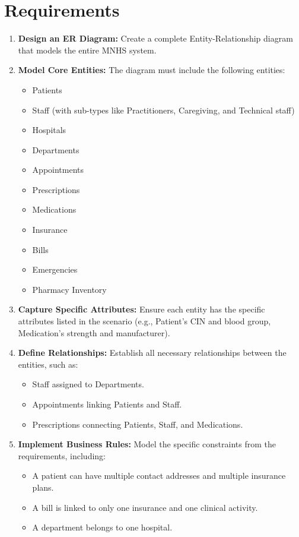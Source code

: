 \documentclass[a4paper,12pt]{article}
\begin{document}
\section{Requirements}
\begin{enumerate}
    \item \textbf{Design an ER Diagram:} Create a complete Entity-Relationship diagram that models the entire MNHS system.
    
    \item \textbf{Model Core Entities:} The diagram must include the following entities:
    \begin{itemize}
        \item Patients
        \item Staff (with sub-types like Practitioners, Caregiving, and Technical staff)
        \item Hospitals
        \item Departments
        \item Appointments
        \item Prescriptions
        \item Medications
        \item Insurance
        \item Bills
        \item Emergencies
        \item Pharmacy Inventory
    \end{itemize}
    
    \item \textbf{Capture Specific Attributes:} Ensure each entity has the specific attributes listed in the scenario (e.g., Patient's CIN and blood group, Medication's strength and manufacturer).
    
    \item \textbf{Define Relationships:} Establish all necessary relationships between the entities, such as:
    \begin{itemize}
        \item Staff assigned to Departments.
        \item Appointments linking Patients and Staff.
        \item Prescriptions connecting Patients, Staff, and Medications.
    \end{itemize}
    
    \item \textbf{Implement Business Rules:} Model the specific constraints from the requirements, including:
    \begin{itemize}
        \item A patient can have multiple contact addresses and multiple insurance plans.
        \item A bill is linked to only one insurance and one clinical activity.
        \item A department belongs to one hospital.
    \end{itemize}
    

\end{enumerate}
\end{document}
